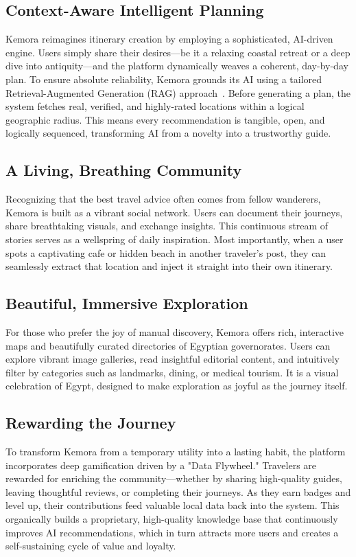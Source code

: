 \subsection{Context-Aware Intelligent Planning}
Kemora reimagines itinerary creation by employing a sophisticated, AI-driven engine. Users simply share their desires---be it a relaxing coastal retreat or a deep dive into antiquity---and the platform dynamically weaves a coherent, day-by-day plan. To ensure absolute reliability, Kemora grounds its AI using a tailored Retrieval-Augmented Generation (RAG) approach~\cite{lewis2020retrieval}. Before generating a plan, the system fetches real, verified, and highly-rated locations within a logical geographic radius. This means every recommendation is tangible, open, and logically sequenced, transforming AI from a novelty into a trustworthy guide.

\subsection{A Living, Breathing Community}
Recognizing that the best travel advice often comes from fellow wanderers, Kemora is built as a vibrant social network. Users can document their journeys, share breathtaking visuals, and exchange insights. This continuous stream of stories serves as a wellspring of daily inspiration. Most importantly, when a user spots a captivating cafe or hidden beach in another traveler's post, they can seamlessly extract that location and inject it straight into their own itinerary.

\subsection{Beautiful, Immersive Exploration}
For those who prefer the joy of manual discovery, Kemora offers rich, interactive maps and beautifully curated directories of Egyptian governorates. Users can explore vibrant image galleries, read insightful editorial content, and intuitively filter by categories such as landmarks, dining, or medical tourism. It is a visual celebration of Egypt, designed to make exploration as joyful as the journey itself.

\subsection{Rewarding the Journey}
To transform Kemora from a temporary utility into a lasting habit, the platform incorporates deep gamification driven by a "Data Flywheel." Travelers are rewarded for enriching the community---whether by sharing high-quality guides, leaving thoughtful reviews, or completing their journeys. As they earn badges and level up, their contributions feed valuable local data back into the system. This organically builds a proprietary, high-quality knowledge base that continuously improves AI recommendations, which in turn attracts more users and creates a self-sustaining cycle of value and loyalty.

